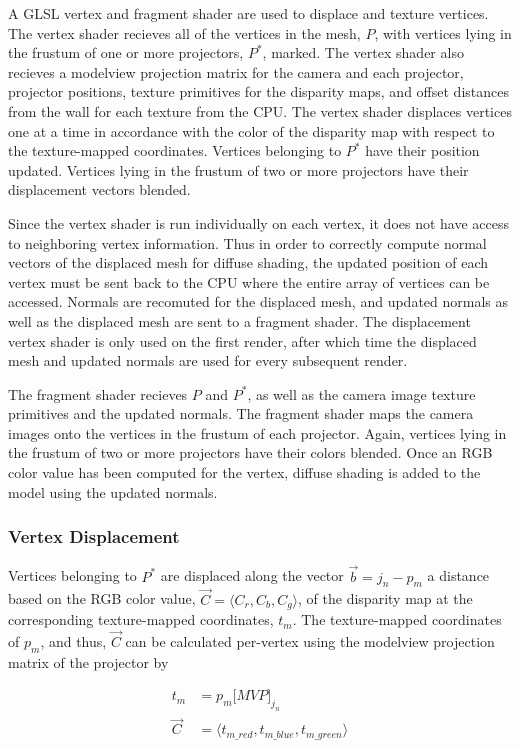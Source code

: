 \documentclass[twocolumn]{article}
\begin{document}
A GLSL vertex and fragment shader are used to displace and texture vertices. The vertex shader recieves all of the vertices in the mesh, $P$, with vertices lying in the frustum of one or more projectors, $P^*$, marked. The vertex shader also recieves a modelview projection matrix for the camera and each projector, projector positions, texture primitives for the disparity maps, and offset distances from the wall for each texture from the CPU. The vertex shader displaces vertices one at a time in accordance with the color of the disparity map with respect to the texture-mapped coordinates. Vertices belonging to $P^{*}$ have their position updated. Vertices lying in the frustum of two or more projectors have their displacement vectors blended.

Since the vertex shader is run individually on each vertex, it does not have access to neighboring vertex information. Thus in order to correctly compute normal vectors of the displaced mesh for diffuse shading, the updated position of each vertex must be sent back to the CPU where the entire array of vertices can be accessed. Normals are recomuted for the displaced mesh, and updated normals as well as the displaced mesh are sent to a fragment shader. The displacement vertex shader is only used on the first render, after which time the displaced mesh and updated normals are used for every subsequent render.

The fragment shader recieves $P$ and $P^{*}$, as well as the camera image texture primitives and the updated normals. The fragment shader maps the camera images onto the vertices in the frustum of each projector. Again, vertices lying in the frustum of two or more projectors have their colors blended. Once an RGB color value has been computed for the vertex, diffuse shading is added to the model using the updated normals.

\subsubsection{Vertex Displacement}

Vertices belonging to $P^{*}$ are displaced along the vector $\vec{b} = j_{n} - p_{m}$ a distance based on the RGB color value, $\vec{C} = \langle C_{r}, C_{b}, C_{g} \rangle$, of the disparity map at the corresponding texture-mapped coordinates, $t_m$. The texture-mapped coordinates of $p_m$, and thus, $\vec{C}$ can be calculated per-vertex using the modelview projection matrix of the projector by

\begin{align}
t_{m} &= p_{m}\lbrack MVP \rbrack _{j_{n}} \\
\vec{C} &= \langle t_{m\_red}, t_{m\_blue}, t_{m\_green} \rangle
\end{align}
\end{document}
